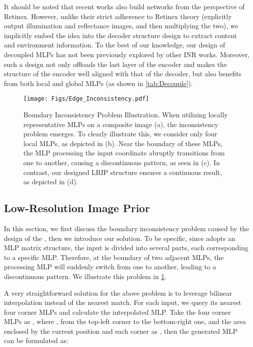 \documentclass[10pt,journal,twocolumn,twoside]{IEEEtran}
\begin{document}
It should be noted that recent works \cite{guo2021intrinsic, guo2021image} also build networks from the perspective of Retinex. However, unlike their strict adherence to Retinex theory (explicitly output illumination and reflectance images, and then multiplying the two), we implicitly embed the idea into the decoder structure design to extract content and environment information. To the best of our knowledge, our design of decoupled MLPs has not been previously explored by other INR works. Moreover, such a design not only offloads the last layer of the encoder and makes the structure of the encoder well aligned with that of the decoder, but also benefits from both local and global MLPs (as shown in \cref{tab:Decouple}).


\begin{figure}[t]
  \centering
   \texttt{[image: Figs/Edge\_Inconsistency.pdf]}
   \caption{Boundary Inconsistency Problem Illustration. When utilizing locally representative MLPs on a composite image (a), the inconsistency problem emerges. To clearly illustrate this, we consider only four local MLPs, as depicted in (b). Near the boundary of these MLPs, the MLP processing the input coordinate abruptly transitions from one to another, causing a discontinuous pattern, as seen in (c). In contrast, our designed LRIP structure ensures a continuous result, as depicted in (d).}
   \label{fig:Edge_Inconsistency}
\end{figure}


\subsection{Low-Resolution Image Prior}
\label{subsec:LRIP}

In this section, we first discuss the boundary inconsistency problem caused by the design of the , then we introduce our solution. To be specific, since  adopts an MLP matrix structure, the input is divided into several parts, each corresponding to a specific MLP. Therefore, at the boundary of two adjacent MLPs, the processing MLP will suddenly switch from one to another, leading to a discontinuous pattern. We illustrate this problem in \cref{fig:Edge_Inconsistency}.

A very straightforward solution for the above problem is to leverage bilinear interpolation instead of the nearest match. For each input, we query its nearest four corner MLPs and calculate the interpolated MLP. Take the four corner MLPs as , where , from the top-left corner to the bottom-right one, and the area enclosed by the current position and each corner as , then the generated MLP can be formulated as:
\end{document}

